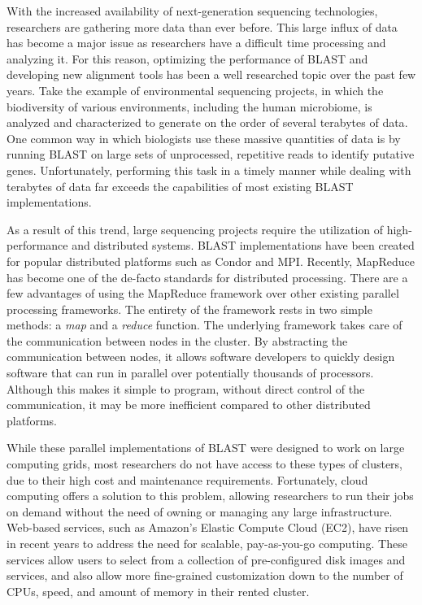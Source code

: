\documentclass[12pt,\mydriver]{thesis}
\begin{document}
With the increased availability of next-generation sequencing technologies, researchers are gathering more data than ever before. This large influx of data has become a major issue as researchers have a difficult time processing and analyzing it. For this reason, optimizing the performance of BLAST and developing new alignment tools has been a well researched topic over the past few years. Take the example of environmental sequencing projects, in which the biodiversity of various environments, including the human microbiome, is analyzed and characterized to generate on the order of several terabytes of data\cite{peterson2009nih}. One common way in which biologists use these massive quantities of data is by running BLAST on large sets of unprocessed, repetitive reads to identify putative genes\cite{li2010est,murray2002identification}. Unfortunately, performing this task in a timely manner while dealing with terabytes of data far exceeds the capabilities of most existing BLAST implementations.

As a result of this trend, large sequencing projects require the utilization of high-performance and distributed systems.
BLAST implementations have been created for popular distributed platforms such as Condor\cite{condor-hunter} and MPI\cite{darling2003design,dongarra1993proposal}.
Recently, MapReduce\cite{dean2008mapreduce} has become one of the de-facto standards for distributed processing.
There are a few advantages of using the MapReduce framework over other existing parallel processing frameworks. The entirety of the framework rests in two simple methods: a \emph{map} and a \emph{reduce} function.
The underlying framework takes care of the communication between nodes in the cluster.
By abstracting the communication between nodes, it allows software developers to quickly design software that can run in parallel over potentially thousands of processors.
Although this makes it simple to program, without direct control of the communication, it may be more inefficient compared to other distributed platforms.



While these parallel implementations of BLAST were designed to work on large computing grids, most researchers do not have access to these types of clusters, due to their high cost and maintenance requirements.
Fortunately, cloud computing offers a solution to this problem, allowing researchers to run their jobs on demand without the need of owning or managing any large infrastructure.
Web-based services, such as Amazon’s Elastic Compute Cloud (EC2)\cite{inc_amazon_2008}, have risen in recent years to address the need for scalable, pay-as-you-go computing.
These services allow users to select from a collection of pre-configured disk images and services, and also allow more fine-grained customization down to the number of CPUs, speed, and amount of memory in their rented cluster.
\end{document}
